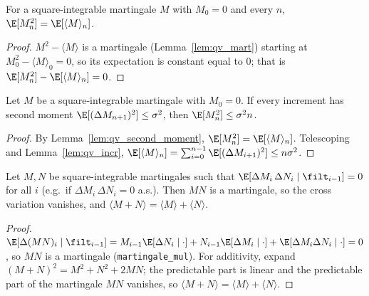 \begin{lemma}\label{lem:qv_second_moment}
\leanok
{}
For a square-integrable martingale $M$ with $M_0 = 0$ and every $n$,
$\E[M_n^2] = \E[\langle M\rangle_n]$.
\end{lemma}

\begin{proof}\leanok
$M^2 - \langle M\rangle$ is a martingale (Lemma~\ref{lem:qv_mart}) starting at
$M_0^2 - \langle M\rangle_0 = 0$, so its expectation is constant equal to $0$;
that is $\E[M_n^2] - \E[\langle M\rangle_n] = 0$.
\end{proof}

\begin{lemma}\label{lem:mart_sq_growth}
\leanok
{}
Let $M$ be a square-integrable martingale with $M_0 = 0$. If every increment has
second moment $\E[(\Delta M_{n+1})^2] \le \sigma^2$, then $\E[M_n^2] \le \sigma^2 n$.
\end{lemma}

\begin{proof}\leanok
By Lemma~\ref{lem:qv_second_moment}, $\E[M_n^2] = \E[\langle M\rangle_n]$.
Telescoping and Lemma~\ref{lem:qv_incr},
$\E[\langle M\rangle_n] = \sum_{i=0}^{n-1}\E[(\Delta M_{i+1})^2] \le n\sigma^2$.
\end{proof}

\begin{lemma}\label{lem:qv_orthogonal}
\leanok
{}
Let $M, N$ be square-integrable martingales such that
$\E[\Delta M_i\, \Delta N_i \mid \filt_{i-1}] = 0$ for all $i$ (e.g.\ if
$\Delta M_i\, \Delta N_i = 0$ a.s.). Then $MN$ is a martingale, so the cross
variation vanishes, and $\langle M + N\rangle = \langle M\rangle + \langle N\rangle$.
\end{lemma}

\begin{proof}\leanok
$\E[\Delta(MN)_i\mid\filt_{i-1}] = M_{i-1}\E[\Delta N_i\mid\cdot]
+ N_{i-1}\E[\Delta M_i\mid\cdot] + \E[\Delta M_i\Delta N_i\mid\cdot] = 0$, so $MN$
is a martingale (\texttt{martingale\_mul}). For additivity, expand
$(M+N)^2 = M^2 + N^2 + 2MN$; the predictable part is linear and the predictable
part of the martingale $MN$ vanishes, so
$\langle M+N\rangle = \langle M\rangle + \langle N\rangle$.
\end{proof}

